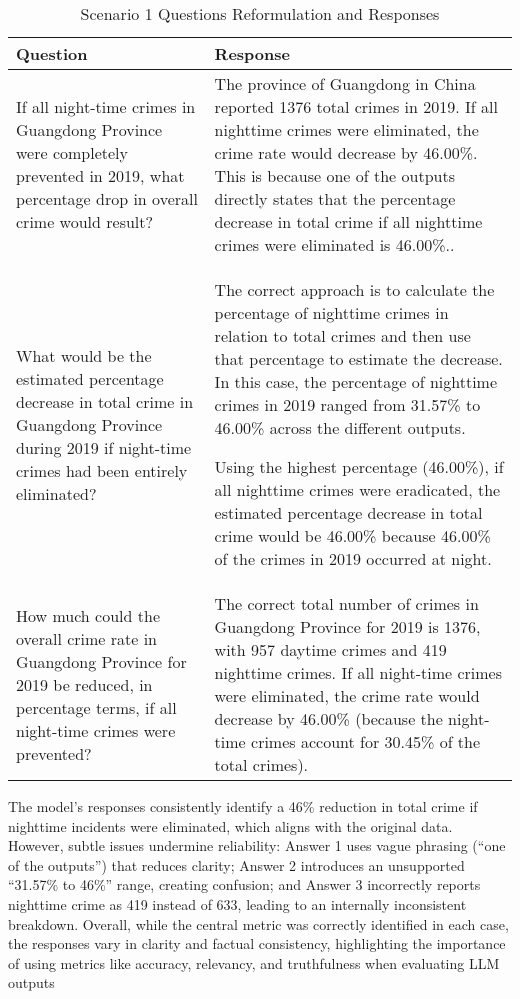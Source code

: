 \begin{table}[H]
\centering
\caption{Scenario 1 Questions Reformulation and Responses}
\label{tab:questions_responses}
\begin{tabular}{|p{}|p{}|}
\hline
\textbf{Question} & \textbf{Response} \\
\hline
If all night-time crimes in Guangdong Province were completely prevented in 2019, what percentage drop in overall crime would result? & The province of Guangdong in China reported 1376 total crimes in 2019. If all nighttime crimes were eliminated, the crime rate would decrease by 46.00\%. This is because one of the outputs directly states that the percentage decrease in total crime if all nighttime crimes were eliminated is 46.00\%.. \\
\hline
What would be the estimated percentage decrease in total crime in Guangdong Province during 2019 if night-time crimes had been entirely eliminated? & The correct approach is to calculate the percentage of nighttime crimes in relation to total crimes and then use that percentage to estimate the decrease. In this case, the percentage of nighttime crimes in 2019 ranged from 31.57\% to 46.00\% across the different outputs.

Using the highest percentage (46.00\%), if all nighttime crimes were eradicated, the estimated percentage decrease in total crime would be 46.00\% because 46.00\% of the crimes in 2019 occurred at night. \\
\hline
How much could the overall crime rate in Guangdong Province for 2019 be reduced, in percentage terms, if all night-time crimes were prevented? & The correct total number of crimes in Guangdong Province for 2019 is 1376, with 957 daytime crimes and 419 nighttime crimes. If all night-time crimes were eliminated, the crime rate would decrease by 46.00\% (because the night-time crimes account for 30.45\% of the total crimes). \\
\hline
\end{tabular}
\end{table}

The model's responses consistently identify a 46\% reduction in total crime if nighttime incidents were eliminated, which aligns with the original data. However, subtle issues undermine reliability: Answer 1 uses vague phrasing (“one of the outputs”) that reduces clarity; Answer 2 introduces an unsupported “31.57\% to 46\%” range, creating confusion; and Answer 3 incorrectly reports nighttime crime as 419 instead of 633, leading to an internally inconsistent breakdown. Overall, while the central metric was correctly identified in each case, the responses vary in clarity and factual consistency, highlighting the importance of using metrics like accuracy, relevancy, and truthfulness when evaluating LLM outputs


